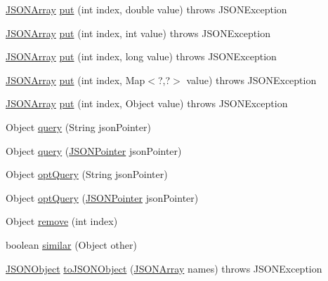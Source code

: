 \begin{DoxyCompactItemize}
\item 
\hyperlink{classorg_1_1json_1_1JSONArray}{J\-S\-O\-N\-Array} \hyperlink{classorg_1_1json_1_1JSONArray_a44381e6efca784b131ff8d384f41447a}{put} (int index, double value)  throws J\-S\-O\-N\-Exception 
\item 
\hyperlink{classorg_1_1json_1_1JSONArray}{J\-S\-O\-N\-Array} \hyperlink{classorg_1_1json_1_1JSONArray_a2283abbc9a0e52077d0cce1a3ed8cd39}{put} (int index, int value)  throws J\-S\-O\-N\-Exception 
\item 
\hyperlink{classorg_1_1json_1_1JSONArray}{J\-S\-O\-N\-Array} \hyperlink{classorg_1_1json_1_1JSONArray_a8e84855241ff2c9af58f47043273956c}{put} (int index, long value)  throws J\-S\-O\-N\-Exception 
\item 
\hyperlink{classorg_1_1json_1_1JSONArray}{J\-S\-O\-N\-Array} \hyperlink{classorg_1_1json_1_1JSONArray_aea74e48046d2ebed46ea9499165b53ba}{put} (int index, Map$<$?,?$>$ value)  throws J\-S\-O\-N\-Exception 
\item 
\hyperlink{classorg_1_1json_1_1JSONArray}{J\-S\-O\-N\-Array} \hyperlink{classorg_1_1json_1_1JSONArray_a5e2cb4652c3cfec3f955edd32e9aaf87}{put} (int index, Object value)  throws J\-S\-O\-N\-Exception 
\item 
Object \hyperlink{classorg_1_1json_1_1JSONArray_aa8f57cbe8177f2063533e29c5bb4a088}{query} (String json\-Pointer)
\item 
Object \hyperlink{classorg_1_1json_1_1JSONArray_ad27351e4257f89ed920e9aaebf373230}{query} (\hyperlink{classorg_1_1json_1_1JSONPointer}{J\-S\-O\-N\-Pointer} json\-Pointer)
\item 
Object \hyperlink{classorg_1_1json_1_1JSONArray_aec9dce2eaf9f212fc0189983c75fca8e}{opt\-Query} (String json\-Pointer)
\item 
Object \hyperlink{classorg_1_1json_1_1JSONArray_a4cfc1c1790a092f20f68a18c1bf74e5a}{opt\-Query} (\hyperlink{classorg_1_1json_1_1JSONPointer}{J\-S\-O\-N\-Pointer} json\-Pointer)
\item 
Object \hyperlink{classorg_1_1json_1_1JSONArray_ae5a2f41647bb60b10ae23e450a238f86}{remove} (int index)
\item 
boolean \hyperlink{classorg_1_1json_1_1JSONArray_ad65b088479ba456bff099c73d0659ae3}{similar} (Object other)
\item 
\hyperlink{classorg_1_1json_1_1JSONObject}{J\-S\-O\-N\-Object} \hyperlink{classorg_1_1json_1_1JSONArray_a1b4d06dc69a1289bc2920c5780305962}{to\-J\-S\-O\-N\-Object} (\hyperlink{classorg_1_1json_1_1JSONArray}{J\-S\-O\-N\-Array} names)  throws J\-S\-O\-N\-Exception 

\end{DoxyCompactItemize}
